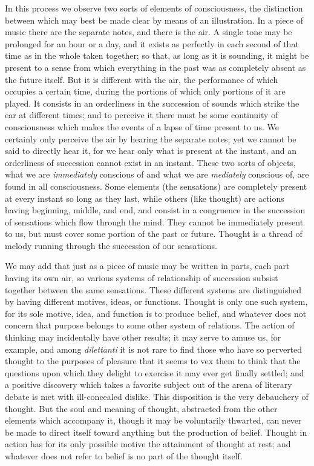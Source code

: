 In this process we observe two sorts of elements of consciousness, the distinction between which may best be made clear by means of an illustration. In a piece of music there are the separate notes, and there is the air. A single tone may be prolonged for an hour or a day, and it exists as perfectly in each second of that time as in the whole taken together; so that, as long as it is sounding, it might be present to a sense from which everything in the past was as completely absent as the future itself. But it is different with the air, the performance of which occupies a certain time, during the portions of which only portions of it are played. It consists in an orderliness in the succession of sounds which strike the ear at different times; and to perceive it there must be some continuity of consciousness which makes the events of a lapse of time present to us. We certainly only perceive the air by hearing the separate notes; yet we cannot be said to directly hear it, for we hear only what is present at the instant, and an orderliness of succession cannot exist in an instant. These two sorts of objects, what we are \emph{immediately} conscious of and what we are
\emph{mediately} conscious of, are found in all consciousness. Some elements (the sensations) are completely present at every instant so long as they last, while others (like thought) are actions having beginning, middle, and end, and consist in a congruence in the succession of sensations which flow through the  mind. They cannot be immediately present to us, but must cover some portion of the past or future. Thought is a thread of melody running through the succession of our sensations.


We may add that just as a piece of music may be written in parts, each part having its own air, so various systems of relationship of succession subsist together between the same sensations. These different systems are distinguished by having different motives, ideas, or functions. Thought is only one such system, for its sole motive, idea, and function is to produce belief, and whatever does not concern that purpose belongs to some other system of relations. The action of thinking may incidentally have other results; it may serve to amuse us, for example, and among \emph{dilettanti} it is not rare to find those who have so perverted thought to the purposes of pleasure that it seems to vex them to think that the questions upon which they delight to exercise it may ever get finally settled; and a positive discovery which takes a favorite subject out of the arena of literary debate is met with ill-concealed dislike. This disposition is the very debauchery of thought. But the soul and meaning of thought, abstracted from the other elements which accompany it, though it may be voluntarily thwarted, can never be made to direct itself toward anything but the production of belief. Thought in action has for its only possible motive the attainment of thought at rest; and whatever does not refer to belief is no part of the thought itself. 

